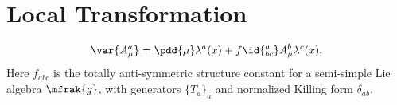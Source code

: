 \documentclass[a4paper,10pt]{article}
\begin{document}
\maketitle
\pagestyle{headings}
\thispagestyle{empty}

\vspace*{-1.5\baselineskip}

\section{Local Transformation}
	\vspace{-.5\baselineskip}
	\begin{equation}
		\var{A^a_\mu}
		= \pdd{\mu} \lambda^a(x)
			+ f\id{^a_{bc}} A^b_\mu \lambda^c(x),
	\label{eq:A_gauge_var}
	\end{equation}
	Here $f_{abc}$ is the totally anti-symmetric structure constant for a semi-simple Lie algebra $\mfrak{g}$, with generators $\{T_a\}_a$ and normalized Killing form $\delta_{ab}$. 
	
\end{document}
